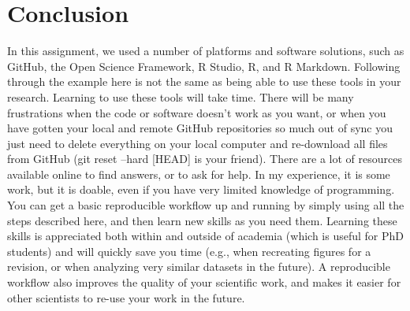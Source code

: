 \documentclass[
  oneside]{book}
\begin{document}
\hypertarget{conclusion-1}{%
\section{Conclusion}\label{conclusion-1}}

In this assignment, we used a number of platforms and software solutions, such as GitHub, the Open Science Framework, R Studio, R, and R Markdown. Following through the example here is not the same as being able to use these tools in your research. Learning to use these tools will take time. There will be many frustrations when the code or software doesn't work as you want, or when you have gotten your local and remote GitHub repositories so much out of sync you just need to delete everything on your local computer and re-download all files from GitHub (git reset --hard {[}HEAD{]} is your friend). There are a lot of resources available online to find answers, or to ask for help. In my experience, it is some work, but it is doable, even if you have very limited knowledge of programming. You can get a basic reproducible workflow up and running by simply using all the steps described here, and then learn new skills as you need them. Learning these skills is appreciated both within and outside of academia (which is useful for PhD students) and will quickly save you time (e.g., when recreating figures for a revision, or when analyzing very similar datasets in the future). A reproducible workflow also improves the quality of your scientific work, and makes it easier for other scientists to re-use your work in the future.

  
\end{document}
